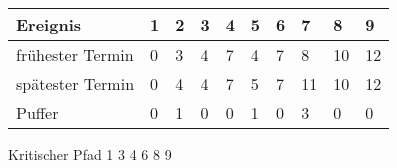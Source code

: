 \documentclass{lehramt-informatik-minimal}
\begin{document}
\begin{tabular}{|l|l|l|l|l|l|l|l|l|l|}
\hline
Ereignis         & 1 & 2 & 3 & 4 & 5 & 6 & 7  & 8  & 9 \\\hline\hline
frühester Termin & 0 & 3 & 4 & 7 & 4 & 7 & 8  & 10 & 12 \\\hline
spätester Termin & 0 & 4 & 4 & 7 & 5 & 7 & 11 & 10 & 12 \\\hline
Puffer           & 0 & 1 & 0 & 0 & 1 & 0 & 3  & 0  & 0 \\\hline
\end{tabular}

Kritischer Pfad 1 3 4 6 8 9
\end{document}
